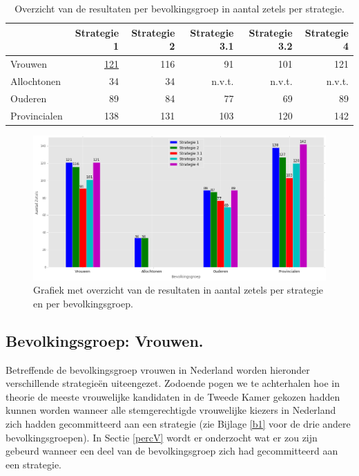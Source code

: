 \begin{table}[h]
\captionsetup{skip=-2pt}
\begin{center}
\begin{footnotesize}
\begin{tabular}{lrrrrr}
\toprule
{} &  Strategie 1 &  Strategie 2 &  Strategie 3.1 &  Strategie 3.2 &  Strategie 4 \\
\midrule
Vrouwen      &         \hyperref[S1V]{121} &          116 &             91 &            101 &          121 \\
Allochtonen  &           34 &           34 &            n.v.t. &           n.v.t. &          n.v.t. \\
Ouderen      &           89 &           84 &             77 &             69 &           89 \\
Provincialen &          138 &          131 &            103 &            120 &          142 \\
\bottomrule
			
			
\end{tabular}
\end{footnotesize}
\end{center}
\caption{Overzicht van de resultaten per bevolkingsgroep in aantal zetels per strategie.}
\label{table:S_overzicht} 
\end{table}


\begin{figure}[H]
\captionsetup{skip=0pt}

	\includegraphics[width=0.95\linewidth]{overzicht_resultaten_strategien_plot.png}

			\caption{Grafiek met overzicht van de resultaten in aantal zetels per strategie en per bevolkingsgroep.}

\label{fig:S_overzicht}
\end{figure}


\subsection{Bevolkingsgroep: Vrouwen.}
\label{vrouwen}
Betreffende de bevolkingsgroep vrouwen in Nederland worden hieronder verschillende strategie\"{e}n uiteengezet. Zodoende pogen we te achterhalen hoe in theorie de meeste vrouwelijke kandidaten in de Tweede Kamer gekozen hadden kunnen worden wanneer alle stemgerechtigde vrouwelijke kiezers in Nederland zich hadden gecommitteerd aan een strategie (zie Bijlage \ref{b1} voor de drie andere bevolkingsgroepen). In Sectie \ref{percV} wordt er onderzocht wat er zou zijn gebeurd wanneer een deel van de bevolkingsgroep zich had gecommitteerd aan een strategie. 

